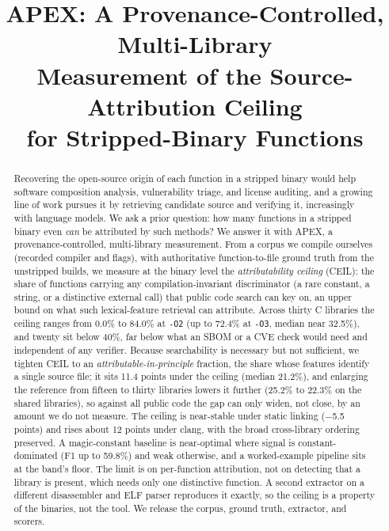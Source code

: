 \documentclass[conference]{IEEEtran}
\begin{document}
\title{APEX: A Provenance-Controlled, Multi-Library\\Measurement of the Source-Attribution Ceiling\\for Stripped-Binary Functions}

\author{%
\and
{}
}
\maketitle

\begin{abstract}
Recovering the open-source origin of each function in a stripped binary would help
software composition analysis, vulnerability triage, and license auditing, and a
growing line of work pursues it by retrieving candidate source and verifying it,
increasingly with language models. We ask a prior question: how many functions in a
stripped binary even \emph{can} be attributed by such methods? We answer it with APEX,
a provenance-controlled, multi-library measurement. From a corpus we compile ourselves
(recorded compiler and flags), with authoritative function-to-file ground truth from
the unstripped builds, we measure at the binary level the \emph{attributability
ceiling} (CEIL): the share of functions carrying any compilation-invariant
discriminator (a rare constant, a string, or a distinctive external call) that public
code search can key on, an upper bound on what such lexical-feature retrieval can
attribute. Across thirty C
libraries the ceiling ranges from 0.0\% to 84.0\% at \texttt{-O2} (up to 72.4\% at
\texttt{-O3}, median near 32.5\%), and twenty sit below 40\%, far below what an SBOM or a
CVE check would need and independent of any verifier. Because searchability is
necessary but not sufficient, we tighten CEIL to an \emph{attributable-in-principle}
fraction, the share whose features identify a single source file; it sits 11.4 points
under the ceiling (median 21.2\%), and enlarging the reference from
fifteen to thirty libraries lowers it further (25.2\% to 22.3\% on the shared libraries),
so against all public code the gap can only widen, not close,
by an amount we do not measure. The ceiling is near-stable under static linking ($-$5.5
points) and rises about 12 points under clang, with the broad cross-library ordering
preserved. A magic-constant baseline is near-optimal where signal is constant-dominated
(F1 up to 59.8\%) and weak otherwise, and a worked-example pipeline sits at the band's
floor. The limit is on per-function attribution, not on detecting that a library is
present, which needs only one distinctive function. A second extractor on a different
disassembler and ELF parser reproduces it exactly, so the ceiling is a property of the
binaries, not the tool. We release the corpus, ground truth, extractor, and scorers.
\end{abstract}
\end{document}
